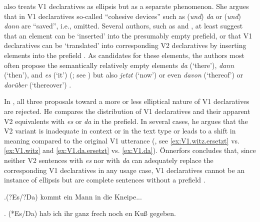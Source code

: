 \citet[300]{sandig2000} also treats V1 declaratives as ellipsis but as a separate phenomenon.
She argues that in V1 declaratives so-called ``cohesive devices'' such as (\textit{und}) \textit{da} or (\textit{und}) \textit{dann} are ``saved'', i.e., omitted.
Several authors, such as \citet{oppenrieder1987} and \citet{imo2013}, at least suggest that an element can be `inserted' into the presumably empty prefield, or that V1 declaratives can be `translated' into corresponding V2  declaratives by inserting elements into the prefield \citep[e.g.,][]{auer1993}.
As candidates for these elements, the authors most often propose the semantically relatively empty elements \textit{da} (`there'), \textit{dann} (`then'), and \textit{es} (`it') (\cite{oppenrieder1987,auer1993, poitou1993,sandig2000,imo2013}; see \cite[][18]{oennerfors1997}) but also \textit{jetzt} (`now') \citep{oppenrieder1987} or even \textit{davon} (`thereof') or \textit{darüber} (`thereover') \citep{imo2013}.

In \citet{oennerfors1997}, all three proposals toward a more or less elliptical nature of V1 declaratives are rejected.
He compares the distribution of V1 declaratives and their apparent V2 equivalents with \textit{es} or \textit{da} in the prefield.
In several cases, he argues that the V2 variant is inadequate in context or in the text type  or leads to a shift in meaning compared to the original V1 utterance (\cite[54--59]{oennerfors1997}, see \ref{ex:V1.witz.ersetzt} vs. \ref{ex:V1.witz} and \ref{ex:V1.da.ersetzt} vs. \ref{ex:V1.da}).
Önnerfors concludes that, since neither V2 sentences with \textit{es} nor with \textit{da} can adequately replace the corresponding V1 declaratives in any usage case, V1 declaratives cannot be an instance of ellipsis but are complete sentences without a prefield \citep[4]{oennerfors1997}.

\ex.\label{ex:V1.witz.ersetzt}(?Es/?Da) kommt ein Mann in die Kneipe...

\ex.\label{ex:V1.da.ersetzt} (*Es/Da) hab ich ihr ganz frech noch en Kuß gegeben.

